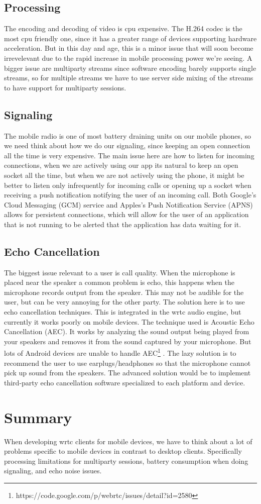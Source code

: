 \subsection{Processing}
The encoding and decoding of video is \gls{cpu} expensive. The H.264 codec is the most \gls{cpu} friendly one, since it has a greater range of devices supporting hardware acceleration. But in this day and age, this is a minor issue that will soon become irrevelevant due to the rapid increase in mobile processing power we're seeing. A bigger issue are multiparty streams since software encoding barely supports single streams, so for multiple streams we have to use server side mixing of the streams to have support for multiparty sessions.


\subsection{Signaling}
The mobile radio is one of most battery draining units on our mobile phones, so we need think about how we do our signaling, since keeping an open connection all the time is very expensive. The main issue here are how to listen for incoming connections, when we are actively using our app its natural to keep an open socket all the time, but when we are not actively using the phone, it might be better to listen only infrequently for incoming calls or opening up a socket when receiving a push notification notifying the user of an incoming call. Both Google's Cloud Messaging (GCM) service and Apples's Push Notification Service (APNS) allows for persistent connections, which will allow for the user of an application that is not running to be alerted that the application has data waiting for it.


\subsection{Echo Cancellation}
The biggest issue relevant to a user is call quality. When the microphone is placed near the speaker a common problem is echo, this happens when the microphone records output from the speaker. This may not be audible for the user, but can be very annoying for the other party. The solution here is to use echo cancellation techniques. This is integrated in the \gls{wrtc} audio engine, but currently it works poorly on mobile devices. The technique used is Acoustic Echo Cancellation (AEC). It works by analyzing the sound output being played from your speakers and removes it from the sound captured by your microphone. But lots of Android devices are unable to handle AEC\footnote{https://code.google.com/p/webrtc/issues/detail?id=2580} . The lazy solution is to recommend the user to use earplugs/headphones so that the microphone cannot pick up sound from the speakers. The advanced solution would be to implement third-party echo cancellation software specialized to each platform and device.


\section{Summary}
When developing \gls{wrtc} clients for mobile devices, we have to think about a lot of problems specific to mobile devices in contrast to desktop clients. Specifically processing limitations for multiparty sessions, battery consumption when doing signaling, and echo noise issues.
